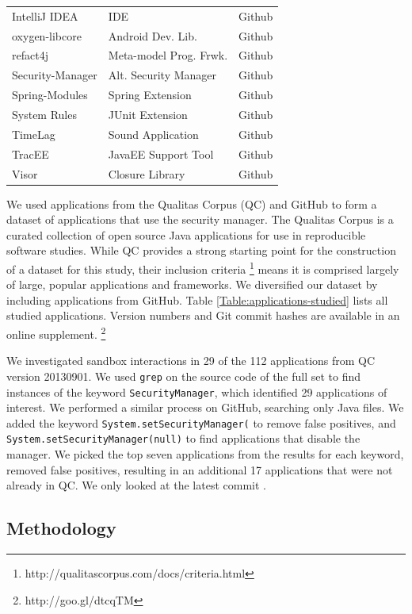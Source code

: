 \documentclass{sig-alternate}
\begin{document}
\begin{table}
\begin{tabular}{lll}
IntelliJ IDEA & IDE & Github\tabularnewline
oxygen-libcore & Android Dev. Lib. & Github\tabularnewline
refact4j & Meta-model Prog. Frwk. & Github\tabularnewline
Security-Manager & Alt. Security Manager & Github\tabularnewline
Spring-Modules & Spring Extension & Github\tabularnewline
System Rules & JUnit Extension & Github\tabularnewline
TimeLag & Sound Application & Github\tabularnewline
TracEE & JavaEE Support Tool & Github\tabularnewline
Visor & Closure Library & Github\tabularnewline
\bottomrule
\end{tabular}
\end{table}

We used applications from the Qualitas Corpus (QC)
\cite{QualitasCorpus:APSEC:2010} and GitHub to form a dataset of applications
that use the security manager.  The Qualitas Corpus is a curated collection of
open source Java applications for use in reproducible software studies.  While
QC provides a strong starting point for the construction of a dataset for this
study, their inclusion criteria%
\footnote{http://qualitascorpus.com/docs/criteria.html%
} means it is comprised largely of large, popular applications and frameworks.
We diversified our dataset by including applications from GitHub. Table
\ref{Table:applications-studied} lists all studied applications. Version numbers
and Git commit hashes are available in an online supplement.%
\footnote{http://goo.gl/dtcqTM%
} 

We investigated sandbox interactions in 29 of the 112 applications from QC
version 20130901.  We used \texttt{grep} on the source code of the full set
to find instances of the keyword \texttt{SecurityManager}, which
identified 29 applications of interest.  We performed a similar process on
GitHub, searching only Java files. We added the keyword
\texttt{System.setSecurityManager(} to remove false positives, and
\texttt{System.setSecurityManager(null)} to find applications that disable the
manager. We picked the top seven applications from the results for each keyword,
removed false positives, resulting in an additional 17 applications that
were not already in QC. We only looked at the latest commit .

\subsection{Methodology}
\end{document}
